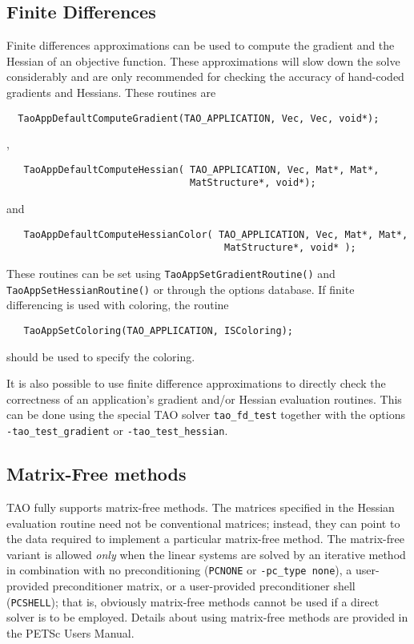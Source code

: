 \subsection{Finite Differences} 
Finite differences approximations can be used to compute the gradient and the
Hessian of an objective
function.  These approximations will slow down the solve considerably and are only 
recommended for checking the accuracy of hand-coded gradients and Hessians.
These routines are 

\begin{verbatim}
  TaoAppDefaultComputeGradient(TAO_APPLICATION, Vec, Vec, void*);
\end{verbatim}, 


\begin{verbatim}
   TaoAppDefaultComputeHessian( TAO_APPLICATION, Vec, Mat*, Mat*, 
                                MatStructure*, void*);
\end{verbatim}
\noindent
and 
\begin{verbatim}
   TaoAppDefaultComputeHessianColor( TAO_APPLICATION, Vec, Mat*, Mat*, 
                                      MatStructure*, void* );
\end{verbatim}
\noindent
These routines can be set using {\tt TaoAppSetGradientRoutine()} and 
{\tt TaoAppSetHessianRoutine()} or through the options database.
If finite differencing is used with coloring, the routine 
\begin{verbatim}
   TaoAppSetColoring(TAO_APPLICATION, ISColoring);
\end{verbatim}
\noindent
should be used to specify the coloring.

It is also possible to use finite difference approximations to directly check
the correctness of an application's gradient and/or Hessian evaluation routines.
This can be done using the special TAO solver {\tt tao\_fd\_test} together with the options
{\tt -tao\_test\_gradient} or {\tt -tao\_test\_hessian}.


\subsection{Matrix-Free methods}
TAO fully supports matrix-free methods. The matrices specified in the
Hessian evaluation routine need not be conventional
matrices; instead, they can point to the data required to implement a
particular matrix-free method.  The matrix-free variant is allowed
{\em only} when the linear systems are solved by an iterative method
in combination with no preconditioning ({\tt PCNONE} or {\tt -pc\_type none}),
a user-provided preconditioner matrix, or a user-provided preconditioner
shell ({\tt PCSHELL}); that is,
obviously matrix-free methods cannot be used if a direct solver is to 
be employed.  %
Details about using matrix-free methods are provided in the
PETSc  Users Manual.


